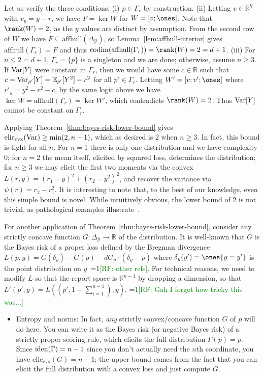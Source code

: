 \documentclass{article}
\newcommand{\Comments}{1}
\newcommand{\mynote}[2]{\ifnum\Comments=1\textcolor{#1}{#2}\fi}
\newcommand{\raf}[1]{\mynote{green}{[RF: #1]}}
\newcommand{\reals}{\mathbb{R}}
\newcommand{\simplex}{\Delta_\Y}
\newcommand{\eliccvx}{\mathrm{elic}_\mathrm{cvx}}
\newcommand{\codim}{\mathrm{codim}}
\newcommand{\affhull}{\mathrm{affhull}}
\newcommand{\E}{\mathbb{E}}
\newcommand{\Y}{\mathcal{Y}}
\begin{document}
Let us verify the three conditions:
(i) $p\in\Gamma_r$ by construction.
(ii) Letting $v\in\reals^\Y$ with $v_y = y - r$, we have $F = \ker W$ for $W = [v;\ones]$.
Note that $\rank(W) = 2$, as the $y$ values are distinct by assumption.
From the second row of $W$ we have $F\subseteq\affhull(\simplex)$, so Lemma~\ref{lem:affhull-interior} gives $\affhull(\Gamma_r) = F$ and thus $\codim(\affhull(\Gamma_r)) = \rank(W) = 2 = d+1$.
(iii)
For $n \leq 2 = d+1$, $\Gamma_r=\{p\}$ is a singleton and we are done; otherwise, assume $n\geq 3$.
If $\mathrm{Var}[Y]$ were constant in $\Gamma_r$, then we would have some $c\in\reals$ such that $c = \Var_{p'}[Y] = \E_{p'} [Y^2] - r^2$ for all $p'\in\Gamma_r$.
Letting $W' = [v;v';\ones]$ where $v'_y = y^2-r^2-c$, by the same logic above we have $\ker W = \affhull(\Gamma_r) = \ker W'$, which contradicts $\rank(W)=2$.
Thus $\mathrm{Var}[Y]$ cannot be constant on $\Gamma_r$.

Applying Theorem~\ref{thm:bayes-risk-lower-bound} gives $\eliccvx(\Var) \geq \min(2,n-1)$, which as desired is $2$ when $n\geq 3$.
In fact, this bound is tight for all $n$.
For $n=1$ there is only one distribution and we have complexity $0$; for $n=2$ the mean itself, elicited by squared loss, determines the distribution; for $n\geq 3$ we may elicit the first two moments via the convex $L(r,y) = (r_1-y)^2 + (r_2-y^2)^2$, and recover the variance via $\psi(r) = r_2-r_1^2$.
It is interesting to note that, to the best of our knowledge, even this simple bound is novel.
While intuitively obvious, the lower bound of 2 is not trivial, as pathological examples illustrate~\cite{frongillo2018elicitation}.

For another application of Theorem~\ref{thm:bayes-risk-lower-bound}, consider any strictly concave function $G:\simplex\to\reals$ of the distribution.
It is well-known that $G$ is the Bayes risk of a proper loss defined by the Bregman divergence $L(p,y) = G(\delta_y) -G(p) - dG_p \cdot (\delta_y - p)$ where $\delta_y(y') = \ones\{y=y'\}$ is the point distribution on $y$~\cite{gneiting2007strictly}\raf{other refs}.
For technical reasons, we need to modify $L$ so that the report space is $\reals^{n-1}$ by dropping a dimension, so that $L'(p',y) = L((p',1-\sum_{i=1}^{n-1}),y)$.
\raf{Gah I forgot how tricky this was...}

\begin{itemize}
\item Entropy and norms: In fact, \emph{any} strictly convex/concave function $G$ of $p$ will do here.  You can write it as the Bayes risk (or negative Bayes risk) of a strictly proper scoring rule, which elicits the full distribution $\Gamma(p) = p$.  Since $\mathrm{iden}(\Gamma) = n-1$ since you don't actually need the $n$th coordinate, you have $\eliccvx(G) = n-1$; the upper bound comes from the fact that you can elicit the full distribution with a convex loss and just compute $G$.
\end{itemize}
\end{document}
